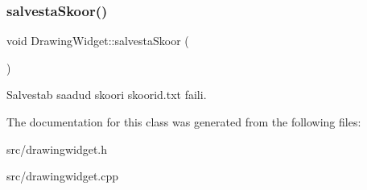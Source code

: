 \subsubsection{\texorpdfstring{salvestaSkoor()}{salvestaSkoor()}}
{\footnotesize\ttfamily void Drawing\+Widget\+::salvesta\+Skoor (\begin{DoxyParamCaption}{ }\end{DoxyParamCaption})\hspace{0.3cm}{\ttfamily [protected]}}

Salvestab saadud skoori skoorid.\+txt faili. 

The documentation for this class was generated from the following files\+:\begin{DoxyCompactItemize}
\item 
src/drawingwidget.\+h\item 
src/drawingwidget.\+cpp\end{DoxyCompactItemize}
